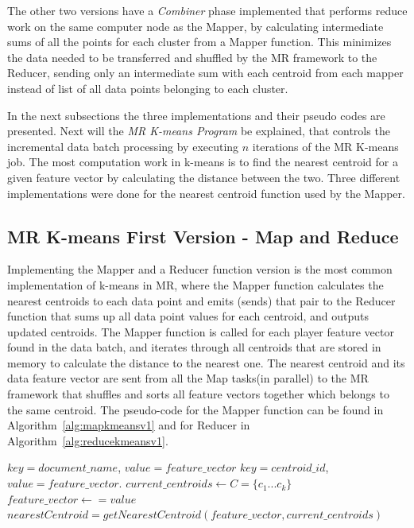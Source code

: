 The other two versions have a \textit{Combiner} phase implemented that performs reduce work on the same computer node as the Mapper, by calculating intermediate sums of all the points for each cluster from a Mapper function. This minimizes the data needed to be transferred and shuffled by the MR framework to the Reducer, sending only an intermediate sum with each centroid from each mapper instead of list of all data points belonging to each cluster.

In the next subsections the three implementations and their pseudo codes are presented. Next will the \textit{MR K-means Program} be explained, that controls the incremental data batch processing by executing $n$ iterations of the MR K-means job. The most computation work in k-means is to find the nearest centroid for a given feature vector by calculating the distance between the two. Three different implementations were done for the nearest centroid function used by the Mapper.

\subsection{MR K-means First Version - Map and Reduce}
\label{sec:kmeansmapreduce}
Implementing the Mapper and a Reducer function version is the most common implementation of k-means in MR, where the Mapper function calculates the nearest centroids to each data point and emits (sends) that pair to the Reducer function that sums up all data point values for each centroid, and outputs updated centroids. The Mapper function is called for each player feature vector found in the data batch, and iterates through all centroids that are stored in memory to calculate the distance to the nearest one. The nearest centroid and its data feature vector are sent from all the Map tasks(in parallel) to the MR framework that shuffles and sorts all feature vectors together which belongs to the same centroid. The pseudo-code for the Mapper function can be found in Algorithm~\ref{alg:mapkmeansv1} and for Reducer in Algorithm~\ref{alg:reducekmeansv1}.

\begin{center}
\newcommand{\map}{\ensuremath{\mbox{\sc K-means First Version: Mapper}}}
\begin{algorithm}[h!]
\caption{$\map(key,value)$}\label{alg:mapkmeansv1}
\begin{algorithmic}[1]
\REQUIRE $key = document\_name$, $value = feature\_vector$
\ENSURE $key = centroid\_id$, $value = feature\_vector$.
\STATE $current\_centroids \leftarrow C = \{c_1...c_k\}$ 
\STATE $feature\_vector \leftarrow = value$
\medskip
\STATE $nearestCentroid = getNearestCentroid(feature\_vector, current\_centroids)$
\medskip
{}
\end{algorithmic}
\end{algorithm}
\end{center}



